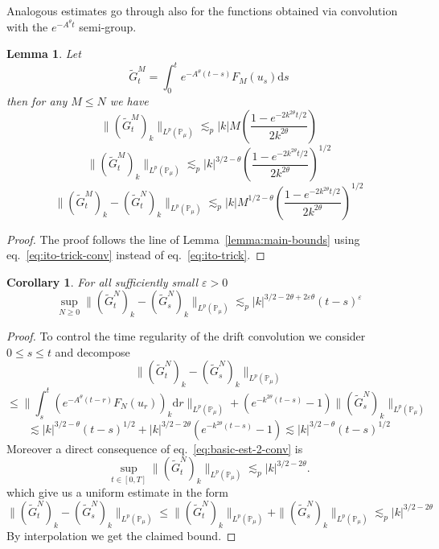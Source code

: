 \documentclass[11pt,a4paper,reqno]{amsart}
\newtheorem{lemma}{Lemma}
\newtheorem{corollary}{Corollary}
\newcommand{\PP}{\mathbb{P}}
\newcommand{\dd}{\mathrm{d}}
\newcommand{\eps}{\varepsilon}
\begin{document}
Analogous estimates go through also for the functions obtained via convolution with the $e^{-A^\theta t}$ semi-group.
\begin{lemma}
\label{lemma:main-bounds-conv}
Let
$$
\tilde G^M_t = \int_0^t e^{-A^\theta (t-s)} F_{M}(u_s) \dd  s
$$
then for any $M\le N$ we have
\begin{equation}
\label{eq:basic-est-1-conv}
\|(\tilde G^M_t)_k\|_{L^p(\PP_\mu)}\lesssim_p |k| M \left(\frac{1-e^{-2k^{2\theta} t/2}}{2k^{2\theta}}\right)
\end{equation}
\begin{equation}
\label{eq:basic-est-2-conv}
\|(\tilde G^M_t)_k\|_{L^p(\PP_\mu)}\lesssim_p |k|^{3/2-\theta} \left(\frac{1-e^{-2k^{2\theta} t/2}}{2k^{2\theta}}\right)^{1/2}
\end{equation}
\begin{equation}
\label{eq:basic-est-3-conv}
\|(\tilde G^M_t)_k-(\tilde G^N_t)_k\|_{L^p(\PP_\mu)}\lesssim_p |k| M^{1/2-\theta} \left(\frac{1-e^{-2k^{2\theta} t/2}}{2k^{2\theta}}\right)^{1/2}
\end{equation}
\end{lemma}
\begin{proof}
The proof follows the line of Lemma~\ref{lemma:main-bounds} using eq.~\eqref{eq:ito-trick-conv} instead of eq.~\eqref{eq:ito-trick}.  
\end{proof}

\begin{corollary}
For all sufficiently small $\eps > 0$
\begin{equation}
\label{eq:basic-est-4-conv}
\sup_{N\ge 0}\|(\tilde G^N_t)_k - (\tilde G^N_s)_k\|_{L^p(\PP_\mu)} \lesssim_{p} |k|^{3/2-2\theta+2\eps \theta} (t-s)^\eps
\end{equation}
\end{corollary}
\begin{proof}
To control the time regularity of the drift convolution we consider $0\le s \le t$ and decompose
$$
\|(\tilde G^N_t)_k - (\tilde G^N_s)_k\|_{L^p(\PP_\mu)}
$$
$$
\le \| \int_s^t (e^{-A^\theta(t-r)} F_{N}(u_r))_k \dd  r\|_{L^p(\PP_\mu)} + (e^{-k^{2\theta}(t-s)}-1)\|(\tilde G^N_s)_k\|_{L^p(\PP_\mu)}
$$
$$
\lesssim |k|^{3/2-\theta} (t-s)^{1/2} +|k|^{3/2-2\theta}(e^{-k^{2\theta}(t-s)}-1)
\lesssim |k|^{3/2-\theta} (t-s)^{1/2}
$$
Moreover a direct consequence of eq.~\eqref{eq:basic-est-2-conv} is
$$
\sup_{t\in[0,T]} \|(\tilde G^N_t)_k \|_{L^p(\PP_\mu)}\lesssim_p |k|^{3/2-2\theta}.
$$
which give us a uniform estimate in the form
$$
\|(\tilde G^N_t)_k - (\tilde G^N_s)_k\|_{L^p(\PP_\mu)} \le \|(\tilde G^N_t)_k\|_{L^p(\PP_\mu)}+\|(\tilde G^N_s)_k\|_{L^p(\PP_\mu)}   \lesssim_{p} |k|^{3/2-2\theta}
$$
By interpolation we get the claimed bound. 
\end{proof}
\end{document}
